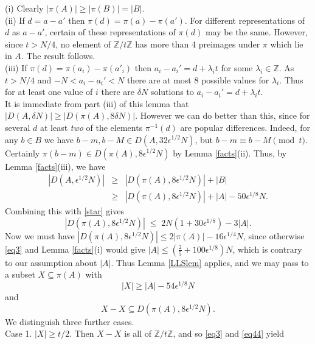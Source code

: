 \documentclass[a4paper,12pt]{article}
\begin{document}
\proof (i) Clearly $|\pi(A)| \geq |\pi(B)| = |B|$.\\
(ii) If $d = a - a'$ then $\pi(d) = \pi(a) - \pi(a')$. For different representations of $d$ as $a - a'$, certain of these representations of $\pi(d)$ may be the same. However, since $t > N/4$, no element of $\mathbb{Z}/t\mathbb{Z}$ has more than 4 preimages under $\pi$ which lie in $A$. The result follows.\\
(iii) If $\pi(d) = \pi(a_i) - \pi(a'_i)$ then $a_i - a_i' = d + \lambda_i t$ for some $\lambda_i \in \mathbb{Z}$. As $t > N/4$ and $-N < a_i - a_i' < N$ there are at most 8 possible values for $\lambda_i$. Thus for at least one value of $i$ there are $\delta N$ solutions to $a_i - a_i' = d + \lambda_i t$.\endproof\\[11pt]
It is immediate from part (iii) of this lemma that $|D(A,\delta N)| \geq |D(\pi(A),8\delta N)|$. However we can do better than this, since for several $d$ at least \textit{two} of the elements $\pi^{-1}(d)$ are popular differences. Indeed, for any $b \in B$ we have $b - m,b - M \in D(A,32\epsilon^{1/2} N)$, but $b - m \equiv b - M\pmod{t}$. Certainly $\pi(b - m) \in D(\pi(A),8\epsilon^{1/2}N)$ by Lemma \ref{facts}(ii). Thus, by Lemma \ref{facts}(iii), we have 
\begin{eqnarray}|D(A,\epsilon^{1/2} N)| & \geq & \nonumber |D(\pi(A),8\epsilon^{1/2}N)| + |B|\\ & \geq & |D(\pi(A),8\epsilon^{1/2}N)| + |A| - 50\epsilon^{1/8}N.\label{eq2} \end{eqnarray}
Combining this with \eqref{star} gives
\begin{equation}\label{eq3} |D(\pi(A),8\epsilon^{1/2} N)| \;\leq \;2N(1 + 30\epsilon^{1/8}) - 3|A|.\end{equation}
Now we must have $|D(\pi(A),8\epsilon^{1/2} N)| \leq 2|\pi(A)| - 16\epsilon^{1/4}N$, since otherwise \eqref{eq3} and Lemma \ref{facts}(i) would give $|A| \leq (\frac{2}{5} + 100 \epsilon^{1/8})N$, which is contrary to our assumption about $|A|$. Thus Lemma \ref{LLSlem} applies, and we may pass to a subset $X \subseteq \pi(A)$ with \begin{equation}\label{eq5}|X| \geq |A| - 54\epsilon^{1/8}N\end{equation} and \begin{equation}\label{eq44}X - X \subseteq D(\pi(A),8\epsilon^{1/2} N).\end{equation} We distinguish three further cases.\\[11pt]
Case 1. $|X| \geq t/2$. Then $X - X$ is all of $\mathbb{Z}/t\mathbb{Z}$, and so \eqref{eq3} and \eqref{eq44} yield
\end{document}
